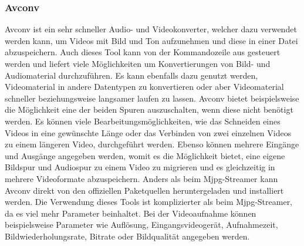 \subsubsection{Avconv}
Avconv ist ein sehr schneller Audio- und Videokonverter, welcher dazu verwendet werden kann, um Videos mit Bild und Ton aufzunehmen und diese in einer Datei abzuspeichern. Auch dieses Tool kann von der Kommandozeile aus gesteuert werden und liefert viele Möglichkeiten um Konvertierungen von Bild- und Audiomaterial durchzuführen. Es kann ebenfalls dazu genutzt werden, Videomaterial in andere Datentypen zu konvertieren oder aber Videomaterial schneller beziehungsweise langsamer laufen zu lassen. Avconv bietet beispielsweise die Möglichkeit eine der beiden Spuren auszuschalten, wenn diese nicht benötigt werden. Es können viele Bearbeitungsmöglichkeiten, wie das Schneiden eines Videos in eine gewünschte Länge oder das Verbinden von zwei einzelnen Videos zu einem längeren Video, durchgeführt werden. Ebenso können mehrere Eingänge und Ausgänge angegeben werden, womit es die Möglichkeit bietet, eine eigene Bildspur und Audiospur zu einem Video zu migrieren und es gleichzeitig in mehrere Videoformate abzuspeichern. Anders als beim Mjpg-Streamer kann Avconv direkt von den offiziellen Paketquellen heruntergeladen und installiert werden. Die Verwendung dieses Tools ist komplizierter als beim Mjpg-Streamer, da es viel mehr Parameter beinhaltet. Bei der Videoaufnahme können beispielsweise Parameter wie Auflösung, Eingangsvideogerät, Aufnahmezeit, Bildwiederholungsrate, Bitrate oder Bildqualität angegeben werden. \cite{Avconv}

